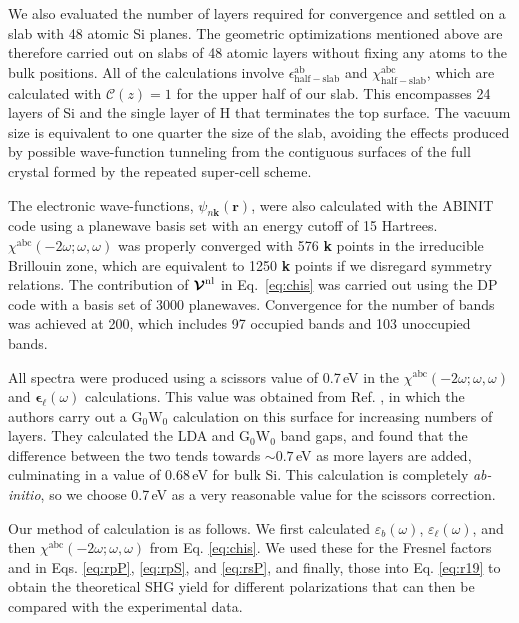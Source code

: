 \documentclass[prb,superscriptaddress,showpacs,twocolumn,letterpaper]{revtex4}
\begin{document}
We also evaluated the number of layers required for convergence and settled on a
slab with 48 atomic Si planes. The geometric optimizations mentioned above are
therefore carried out on slabs of 48 atomic layers without fixing any atoms to
the bulk positions. All of the calculations involve
$\epsilon^{\mathrm{ab}}_{\mathrm{half-slab}}$ and
$\chi^{\mathrm{abc}}_{\mathrm{half-slab}}$, which are calculated with
${\mathbf{\mathcal{C}}}(z)=1$ for the upper half of our slab. This encompasses
24 layers of Si and the single layer of H that terminates the top surface. The
vacuum size is equivalent to one quarter the size of the slab, avoiding the
effects produced by possible wave-function tunneling from the contiguous
surfaces of the full crystal formed by the repeated super-cell
scheme.\cite{mendozaPRB06}

The electronic wave-functions, $\psi_{n\mathbf{k}}(\mathbf{r})$, were also
calculated with the ABINIT code using a planewave basis set with an energy
cutoff of 15 Hartrees. $\chi^{\mathrm{abc}}(-2\omega;\omega,\omega)$ was
properly converged with 576 \textbf{k} points in the irreducible Brillouin zone,
which are equivalent to 1250 \textbf{k} points if we disregard symmetry
relations. The contribution of $\boldsymbol{\mathcal{\cal V}}^\mathrm{nl}$ in
Eq.~\eqref{eq:chis} was carried out using the DP\cite{olevanoDP} code with a
basis set of 3000 planewaves. Convergence for the number of bands was achieved
at 200, which includes 97 occupied bands and 103 unoccupied bands.

All spectra were produced using a scissors value of 0.7\,eV in the
$\chi^{\mathrm{abc}}(-2\omega;\omega,\omega)$ and
$\boldsymbol{\epsilon}_{\ell}(\omega)$ calculations. This value was obtained
from Ref. , in which the authors carry out a
$\mathrm{G}_{0}\mathrm{W}_{0}$ calculation on this surface for increasing
numbers of layers. They calculated the LDA and $\mathrm{G}_{0}\mathrm{W}_{0}$
band gaps, and found that the difference between the two tends towards
$\sim0.7$\,eV as more layers are added, culminating in a value of 0.68\,eV for
bulk Si. This calculation is completely \emph{ab-initio}, so we choose 0.7\,eV
as a very reasonable value for the scissors correction.

Our method of calculation is as follows. We first calculated
$\varepsilon_{b}(\omega)$, $\varepsilon_{\ell}(\omega)$, and then
$\chi^{\mathrm{abc}}(-2\omega;\omega,\omega)$ from Eq. \eqref{eq:chis}. We used
these for the Fresnel factors and in Eqs. \eqref{eq:rpP}, \eqref{eq:rpS}, and
\eqref{eq:rsP}, and finally, those into Eq. \eqref{eq:r19} to obtain the
theoretical SHG yield for different polarizations that can then be compared with
the experimental data.
\end{document}
